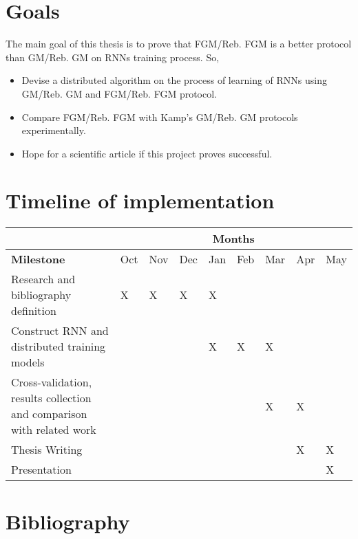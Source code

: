 \documentclass{article}
\begin{document}
    \section*{Goals}
    The main goal of this thesis is to prove that FGM/Reb. FGM is a better protocol than GM/Reb. GM on RNNs training process. So, \\
    \begin{itemize}
        \item Devise a distributed algorithm on the process of learning of RNNs using GM/Reb. GM and FGM/Reb. FGM protocol.
        \item Compare FGM/Reb. FGM with Kamp's GM/Reb. GM protocols experimentally.
        \item Hope for a scientific article if this project proves successful.
    \end{itemize}

    \newpage
    \section*{Timeline of implementation}
    \begin{center}
        \begin{tabular}{|p{3.5cm}|p{0.5cm}|p{0.5cm}|p{0.5cm}|p{0.5cm}|p{0.5cm}|p{0.5cm}|p{0.5cm}|p{0.5cm}|}
            \hline
            \cellcolor{gray} & \multicolumn{8}{c|}{Months} \\
            \hline
            \textbf{Milestone} & Oct & Nov & Dec & Jan & Feb & Mar & Apr & May \\
            \hline
            Research and bibliography definition & X & X & X & X & & & &   \\
            \hline
            Construct RNN and distributed training models & & & & X & X & X & &   \\
            \hline
            Cross-validation, results collection and comparison with related work & & & & & & X & X &   \\
            \hline
            Thesis Writing & & & & & & & X & X  \\
            \hline
            Presentation & & & & & & & & X  \\
            \hline
        \end{tabular}
    \end{center}

    \section*{Bibliography}
\end{document}
